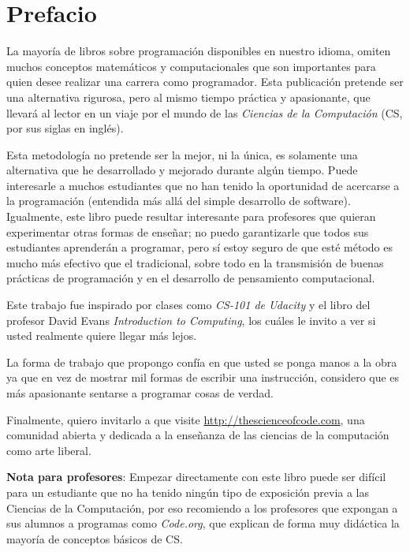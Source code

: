 \thispagestyle{empty}

\chapter{Prefacio}
    La mayoría de libros sobre programación disponibles en nuestro idioma, omiten muchos conceptos matemáticos y computacionales que son importantes para quien desee realizar una carrera como programador. Esta publicación pretende ser una alternativa rigurosa, pero al mismo tiempo práctica y apasionante, que llevará al lector en un viaje por el mundo de las \emph{Ciencias de la Computación} (CS, por sus siglas en inglés).    
    
    Esta metodología no pretende ser la mejor, ni la única, es solamente una alternativa que he desarrollado y mejorado durante algún tiempo. Puede interesarle a muchos estudiantes que no han tenido la oportunidad de acercarse a la programación (entendida más allá del simple desarrollo de software). Igualmente, este libro puede resultar interesante para profesores que quieran experimentar otras formas de enseñar; no puedo garantizarle que todos sus estudiantes aprenderán a programar, pero sí estoy seguro de que esté método es mucho más efectivo que el tradicional, sobre todo en la transmisión de buenas prácticas de programación y en el desarrollo de pensamiento computacional.
    
    Este trabajo fue inspirado por clases como \emph{CS-101 de Udacity} y el libro del profesor David Evans \emph{Introduction to Computing}, los cuáles le invito a ver si usted realmente quiere llegar más lejos. 
    
    La forma de trabajo que propongo confía en que usted se ponga manos a la obra ya que en vez de mostrar mil formas de escribir una instrucción, considero que es más apasionante sentarse a programar cosas de verdad.
    
  Finalmente, quiero invitarlo a que visite \url{http://thescienceofcode.com}, una comunidad abierta y dedicada a la enseñanza de las ciencias de la computación como arte liberal.

    
    \newpage
    \thispagestyle{empty}
        \textbf{Nota para profesores}: Empezar directamente con este libro puede ser difícil para un estudiante que no ha tenido ningún tipo de exposición previa a las Ciencias de la Computación, por eso recomiendo a los profesores que expongan a sus alumnos a programas como \emph{Code.org}, que explican de forma muy didáctica la mayoría de conceptos básicos de CS.
      
    
  
    
 